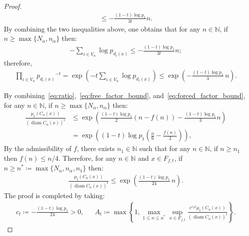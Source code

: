 \documentclass[12pt,reqno]{amsart}
\theoremstyle{definition}
\theoremstyle{plain}
\begin{document}
\begin{proof}
\begin{align*}
        \leq -\frac{(1-t)\log p_1}{3t}n.
    \end{align*}
    By combining the two inequalities above, one obtains that for any $n\in\mathbb{N}$, if $n\geq \max{\{N_\alpha,n_\alpha\}}$ then:
    \begin{align*}
        -\sum_{i\in V_n} \log p_{d_i(x)} \leq -\frac{(1-t)\log p_1}{3t}n;
    \end{align*}
    therefore,
    \begin{align}\label{eq:forced_factor_bound}
        \prod_{i\in V_n} {p_{d_i(x)}}^{-t}
        = \exp{\left(-t\sum_{i\in V_n}\log p_{d_i(x)}\right)}
        \leq \exp\!\left(-\frac{(1-t)\log p_1}{3}\,n\right).
    \end{align}
    
    By combining~\eqref{eq:ratio},~\eqref{eq:free_factor_bound}, and~\eqref{eq:forced_factor_bound}, for any $n\in\mathbb{N}$, if $n\geq \max{\{N_\alpha,n_\alpha\}}$ then:
    \begin{align*}
    \frac{\mu_t(C_n(x))}{(\operatorname{diam}C_n(x))^t}
    &\leq
    \exp{\left(\frac{(1-t)\log p_1}{2}(n-f(n))-\frac{(1-t)\log p_1}{3}n\right)}
    \\
    &=
    \exp{\left((1-t)\log p_1\left(\frac{n}{6}-\frac{f(n)}{2}\right)\right)},
    \end{align*}
    By the admissibility of $f$, there exists $n_1\in\mathbb{N}$ such that for any $n\in\mathbb{N}$, if $n\geq n_1$ then $f(n)\leq n/4$. Therefore, for any $n\in\mathbb{N}$ and $x\in F_{f,t}$, if $n\geq n^*\coloneqq\max{\{N_\alpha,n_\alpha,n_1\}}$ then:
    \begin{align*}
    \frac{\mu_t(C_n(x))}{(\operatorname{diam}C_n(x))^t}
    \leq
    \exp{\left(\frac{(1-t)\log p_1}{24}\,n\right)}.
    \end{align*}
    The proof is completed by taking:
    \begin{align*}
        c_t\coloneqq-\frac{(1-t)\log p_1}{24}>0, &&
        A_t\coloneqq\max{\left\{1,\max_{1\leq n\leq n^*}{\sup_{x\in F_{f,t}}{\frac{e^{c_tn}\mu_t(C_n(x))}{(\operatorname{diam}C_n(x))^t}}}\right\}}.
    \end{align*}
\end{proof}
\end{document}
